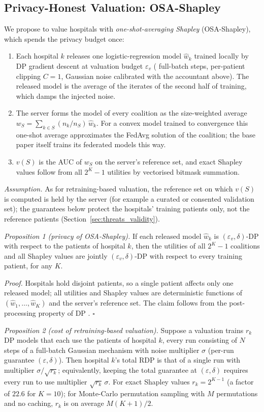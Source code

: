 \documentclass[journal]{IEEEtran}
\begin{document}
\subsection{Privacy-Honest Valuation: OSA-Shapley}
\label{sec:osa}
We propose to value hospitals with \emph{one-shot-averaging Shapley} (OSA-Shapley), which spends the privacy budget once:
\begin{enumerate}
\item Each hospital $k$ releases one logistic-regression model $\hat w_k$ trained locally by DP gradient descent at valuation budget $\varepsilon_v$ (\osaSteps{} full-batch steps, per-patient clipping $C=1$, Gaussian noise calibrated with the accountant above). The released model is the average of the iterates of the second half of training, which damps the injected noise.
\item The server forms the model of every coalition as the size-weighted average $w_S = \sum_{k\in S} (n_k/n_S)\,\hat w_k$. For a convex model trained to convergence this one-shot average approximates the FedAvg solution of the coalition; the base paper itself trains its federated models this way.
\item $v(S)$ is the AUC of $w_S$ on the server's reference set, and exact Shapley values follow from all $2^K-1$ utilities by vectorised bitmask summation.
\end{enumerate}
\emph{Assumption.} As for retraining-based valuation, the reference set on which $v(S)$ is computed is held by the server (for example a curated or consented validation set); the guarantees below protect the hospitals' training patients only, not the reference patients (Section~\ref{sec:threats_validity}).

\emph{Proposition 1 (privacy of OSA-Shapley).} If each released model $\hat w_k$ is $(\varepsilon_v,\delta)$-DP with respect to the patients of hospital $k$, then the utilities of all $2^K-1$ coalitions and all Shapley values are jointly $(\varepsilon_v,\delta)$-DP with respect to every training patient, for any $K$.

\emph{Proof.} Hospitals hold disjoint patients, so a single patient affects only one released model; all utilities and Shapley values are deterministic functions of $(\hat w_1,\dots,\hat w_K)$ and the server's reference set. The claim follows from the post-processing property of DP \cite{Dwork2008DPSurvey}. $\square$

\emph{Proposition 2 (cost of retraining-based valuation).} Suppose a valuation trains $r_k$ DP models that each use the patients of hospital $k$, every run consisting of $N$ steps of a full-batch Gaussian mechanism with noise multiplier $\sigma$ (per-run guarantee $(\varepsilon,\delta)$). Then hospital $k$'s total RDP is that of a single run with multiplier $\sigma/\sqrt{r_k}$; equivalently, keeping the total guarantee at $(\varepsilon,\delta)$ requires every run to use multiplier $\sqrt{r_k}\,\sigma$. For exact Shapley values $r_k=2^{K-1}$ (a factor of $22.6$ for $K=10$); for Monte-Carlo permutation sampling with $M$ permutations and no caching, $r_k$ is on average $M(K+1)/2$.
\end{document}
